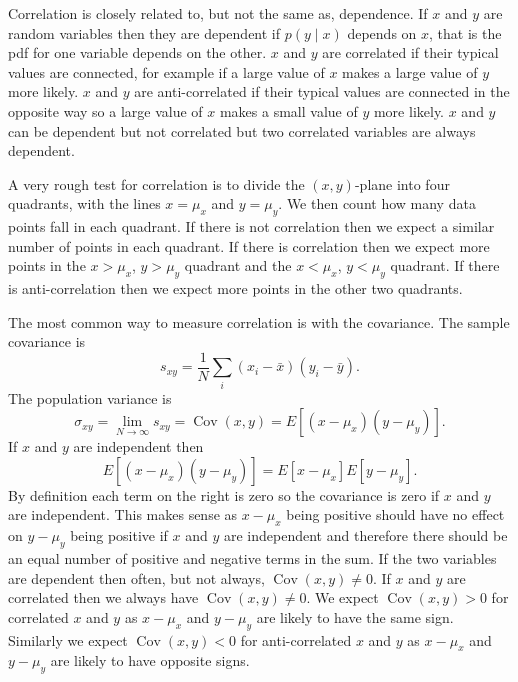 \documentclass[a4paper]{article}
\newcommand{\st}{\mid}
\DeclareMathOperator{\Cov}{Cov}
\begin{document}
    Correlation is closely related to, but not the same as, dependence.
    If \(x\) and \(y\) are random variables then they are dependent if \(p(y\st x)\) depends on \(x\), that is the \gls{pdf} for one variable depends on the other.
    \(x\) and \(y\) are correlated if their typical values are connected, for example if a large value of \(x\) makes a large value of \(y\) more likely.
    \(x\) and \(y\) are anti-correlated if their typical values are connected in the opposite way so a large value of \(x\) makes a small value of \(y\) more likely.
    \(x\) and \(y\) can be dependent but not correlated but two correlated variables are always dependent.
    
    A very rough test for correlation is to divide the \((x, y)\)-plane into four quadrants, with the lines \(x = \mu_x\) and \(y = \mu_y\).
    We then count how many data points fall in each quadrant.
    If there is not correlation then we expect a similar number of points in each quadrant.
    If there is correlation then we expect more points in the \(x > \mu_x\), \(y > \mu_y\) quadrant and the \(x < \mu_x\), \(y < \mu_y\) quadrant.
    If there is anti-correlation then we expect more points in the other two quadrants.
    
    The most common way to measure correlation is with the covariance.
    The sample covariance is
    \[s_{xy} = \frac{1}{N}\sum_{i} (x_i - \bar{x})(y_i - \bar{y}).\]
    The population variance is
    \[\sigma_{xy} = \lim_{N\to\infty}s_{xy} = \Cov(x, y) = E[(x - \mu_x)(y - \mu_y)].\]
    If \(x\) and \(y\) are independent then
    \[E[(x - \mu_x)(y - \mu_y)] = E[x - \mu_x]E[y - \mu_y].\]
    By definition each term on the right is zero so the covariance is zero if \(x\) and \(y\) are independent.
    This makes sense as \(x - \mu_x\) being positive should have no effect on \(y - \mu_y\) being positive if \(x\) and \(y\) are independent and therefore there should be an equal number of positive and negative terms in the sum.
    If the two variables are dependent then often, but not always, \(\Cov(x, y) \ne 0\).
    If \(x\) and \(y\) are correlated then we always have \(\Cov(x, y) \ne 0\).
    We expect \(\Cov(x, y) > 0\) for correlated \(x\) and \(y\) as \(x - \mu_x\) and \(y - \mu_y\) are likely to have the same sign.
    Similarly we expect \(\Cov(x, y) < 0\) for anti-correlated \(x\) and \(y\) as \(x - \mu_x\) and \(y - \mu_y\) are likely to have opposite signs.
    
\end{document}
